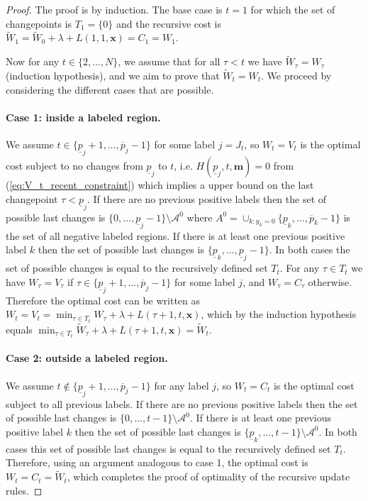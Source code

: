 \documentclass[12pt]{article}
\begin{document}
\begin{proof}
The proof is by induction. 
The base case is $t=1$ for which the set of changepoints is $T_1=\{0\}$ and the recursive cost is $\tilde W_1=\tilde W_0 + \lambda + L(1, 1, \mathbf x)  =C_1=W_1$.

Now for any $t\in\{2,\dots, N\}$, we assume that for all $\tau<t$ we have $\tilde W_\tau=W_\tau$ (induction hypothesis), and we aim to prove that $\tilde W_t = W_t$.
We proceed by considering the different cases that are possible. 
\paragraph{Case 1: inside a labeled region.} 
We assume $t\in \{ \underline p_j+1, \dots, \overline p_j-1\}$ for some label $j=J_t$, so $W_t=V_t$ is the optimal cost subject to no changes from $\underline p_j$ to $t$, i.e. $H(\underline p_j, t, \mathbf m)=0$ from (\ref{eq:V_t_recent_constraint}) which implies a upper bound on the last changepoint $\tau<\underline p_j$. 
If there are no previous positive labels then the set of possible last changes is $\{0, \dots, \underline p_j - 1\}\setminus \mathcal A^0$ where $A^0=\cup_{k:y_k=0}\{\underline p_k, \dots, \overline p_k-1\}$ is the set of all negative labeled regions. 
If there is at least one previous positive label $k$ then the set of possible last changes is $\{\underline p_{k}, \dots, \underline p_j - 1\}$. 
In both cases the set of possible changes is equal to the recursively defined set $T_t$. 
For any $\tau\in T_t$ we have $W_\tau=V_\tau$ if $\tau\in\{ \underline p_j+1,\dots, \overline p_j-1\}$ for some label $j$, and $W_\tau=C_\tau$ otherwise.
Therefore the optimal cost can be written as $W_t=V_t=\min_{\tau\in T_t} W_\tau + \lambda + L(\tau+1, t, \mathbf x)$, which by the induction hypothesis equals $\min_{\tau\in T_t} \tilde W_\tau + \lambda + L(\tau+1, t, \mathbf x) = \tilde W_t$.
\paragraph{Case 2: outside a labeled region.}
We assume $t\not \in \{ \underline p_j+1, \dots, \overline p_j-1\}$ for any label $j$, so $W_t=C_t$ is the optimal cost subject to all previous labels.
If there are no previous positive labels then the set of possible last changes is $\{0, \dots, t-1\}\setminus \mathcal A^0$.
If there is at least one previous positive label $k$ then the set of possible last changes is $\{\underline p_{k}, \dots, t - 1\}\setminus \mathcal A^0$.
In both cases this set of possible last changes is equal to the recursively defined set $T_t$. Therefore, using an argument analogous to case 1, the optimal cost is $W_t=C_t=\tilde W_t$, which completes the proof of optimality of the recursive update rules.
\end{proof}
\end{document}
